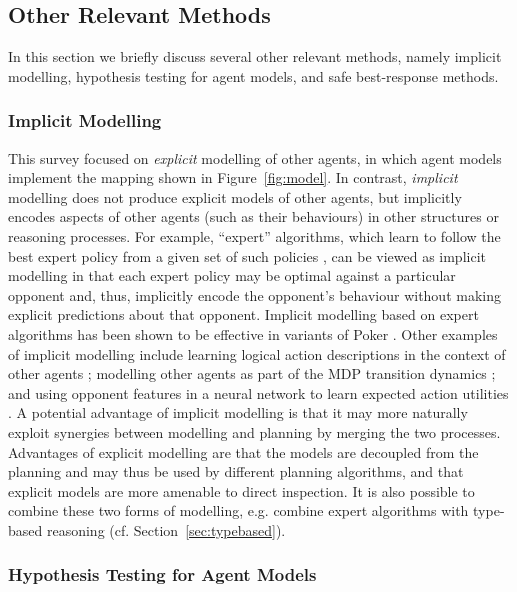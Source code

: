 \documentclass[final,1p,times,authoryear]{elsarticle}
\begin{document}
		\subsection{\bf Other Relevant Methods} \label{sec:other}

In this section we briefly discuss several other relevant methods, namely implicit modelling, hypothesis testing for agent models, and safe best-response methods.

			\subsubsection{Implicit Modelling} \label{sec:other-implicit}

This survey focused on \emph{explicit} modelling of other agents, in which agent models implement the mapping shown in Figure~\ref{fig:model}. In contrast, \emph{implicit} modelling does not produce explicit models of other agents, but implicitly encodes aspects of other agents (such as their behaviours) in other structures or reasoning processes. For example, ``expert'' algorithms, which learn to follow the best expert policy from a given set of such policies \citep[e.g.][]{c2014,fm2004}, can be viewed as implicit modelling in that each expert policy may be optimal against a particular opponent and, thus, implicitly encode the opponent's behaviour without making explicit predictions about that opponent. Implicit modelling based on expert algorithms has been shown to be effective in variants of Poker \citep{bjbb2013,hshb2005}. Other examples of implicit modelling include learning logical action descriptions in the context of other agents \citep{igos2010,ges2004}; modelling other agents as part of the MDP transition dynamics \citep{hzt2017}; and using opponent features in a neural network to learn expected action utilities \citep{hbkd2016}. A potential advantage of implicit modelling is that it may more naturally exploit synergies between modelling and planning by merging the two processes. Advantages of explicit modelling are that the models are decoupled from the planning and may thus be used by different planning algorithms, and that explicit models are more amenable to direct inspection. It is also possible to combine these two forms of modelling, e.g. \citet{acr2015mipc} combine expert algorithms with type-based reasoning (cf. Section~\ref{sec:typebased}).


			\subsubsection{Hypothesis Testing for Agent Models} \label{sec:other-testing}
\end{document}
